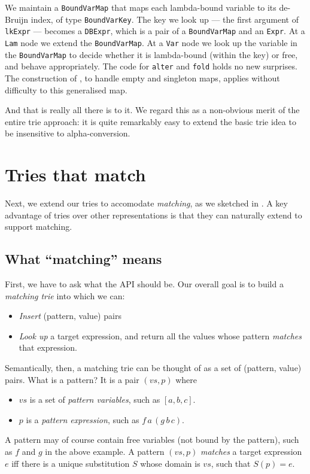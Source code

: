 \documentclass[acmsmall]{acmart}
\theoremstyle{theorem}
\theoremstyle{definition}
\theoremstyle{remark}
\begin{document}
We maintain a \lstinline{BoundVarMap}
that maps each lambda-bound variable to its de-Bruijn index, of type \lstinline{BoundVarKey}.  The key
we look up --- the first argument of \lstinline{lkExpr} --- becomes a \lstinline{DBExpr},
which is a pair of a \lstinline{BoundVarMap} and an \lstinline{Expr}.
At a \lstinline{Lam}
node we extend the \lstinline{BoundVarMap}. At a \lstinline{Var} node we
look up the variable in the \lstinline{BoundVarMap} to decide whether it is
lambda-bound (within the key) or free, and behave appropriately.
The code for \lstinline{alter} and \lstinline{fold} holds no new surprises.
The construction of , to handle empty and singleton maps,
applies without difficulty to this generalised map.

And that is really all there is to it.  We regard this as a non-obvious merit
of the entire trie approach: it is quite remarkably easy to extend the basic
trie idea to be insensitive to alpha-conversion.

\section{Tries that match}

Next, we extend our tries to accomodate \emph{matching}, as we
sketched in .  A key advantage of tries over other representations is
that they can naturally extend to support matching.

\subsection{What ``matching'' means}

First, we have to ask what the API should be.
Our overall goal is to build a \emph{matching trie} into which we can:
\begin{itemize}
\item \emph{Insert} (pattern, value) pairs
\item \emph{Look up} a target expression, and return all the values whose pattern \emph{matches} that expression.
\end{itemize}
Semantically, then, a matching trie can be thought of as a set of (pattern, value) pairs.
What is a pattern? It is a pair $(vs,p)$ where
\begin{itemize}
\item $vs$ is a set of \emph{pattern variables}, such as $[a,b,c]$.
\item $p$ is a \emph{pattern expression}, such as $f\, a\, (g\, b\, c)$.
\end{itemize}
A pattern may of course contain free variables (not bound by the pattern), such as $f$ and $g$
in the above example.
A pattern $(vs, p)$ \emph{matches} a target expression $e$ iff there is a unique substitution
$S$ whose domain is $vs$, such that $S(p) = e$.
\end{document}
